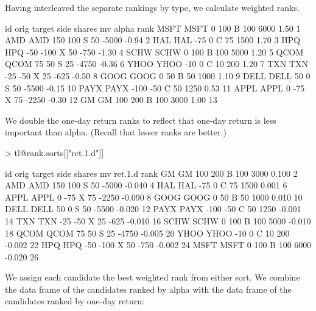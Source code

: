 \documentclass{article}
\begin{document}
Having interleaved the separate rankings by type, we calculate
weighted ranks.

\begin{Schunk}
\begin{Soutput}
       id orig target side shares    mv alpha rank
MSFT MSFT    0    100    B    100  6000  1.50    1
AMD   AMD  150    100    S     50 -5000 -0.94    2
HAL   HAL  -75      0    C     75  1500  1.70    3
HPQ   HPQ  -50   -100    X     50  -750 -1.30    4
SCHW SCHW    0    100    B    100  5000  1.20    5
QCOM QCOM   75     50    S     25 -4750 -0.36    6
YHOO YHOO  -10      0    C     10   200  1.20    7
TXN   TXN  -25    -50    X     25  -625 -0.50    8
GOOG GOOG    0     50    B     50  1000  1.10    9
DELL DELL   50      0    S     50 -5500 -0.15   10
PAYX PAYX -100    -50    C     50  1250  0.53   11
APPL APPL    0    -75    X     75 -2250 -0.30   12
GM     GM  100    200    B    100  3000  1.00   13
\end{Soutput}
\end{Schunk}

We double the one-day return ranks to reflect that one-day return is
less important than alpha.  (Recall that lesser ranks are better.)

\begin{Schunk}
\begin{Sinput}
> tl@rank.sorts[["ret.1.d"]]
\end{Sinput}
\begin{Soutput}
       id orig target side shares    mv ret.1.d rank
GM     GM  100    200    B    100  3000   0.100    2
AMD   AMD  150    100    S     50 -5000  -0.040    4
HAL   HAL  -75      0    C     75  1500   0.001    6
APPL APPL    0    -75    X     75 -2250  -0.090    8
GOOG GOOG    0     50    B     50  1000   0.010   10
DELL DELL   50      0    S     50 -5500  -0.020   12
PAYX PAYX -100    -50    C     50  1250  -0.001   14
TXN   TXN  -25    -50    X     25  -625  -0.010   16
SCHW SCHW    0    100    B    100  5000  -0.010   18
QCOM QCOM   75     50    S     25 -4750  -0.005   20
YHOO YHOO  -10      0    C     10   200  -0.002   22
HPQ   HPQ  -50   -100    X     50  -750  -0.002   24
MSFT MSFT    0    100    B    100  6000  -0.020   26
\end{Soutput}
\end{Schunk}

We assign each candidate the best weighted rank from either sort.  We
combine the data frame of the candidates ranked by alpha with the data
frame of the candidates ranked by one-day return:
\end{document}
